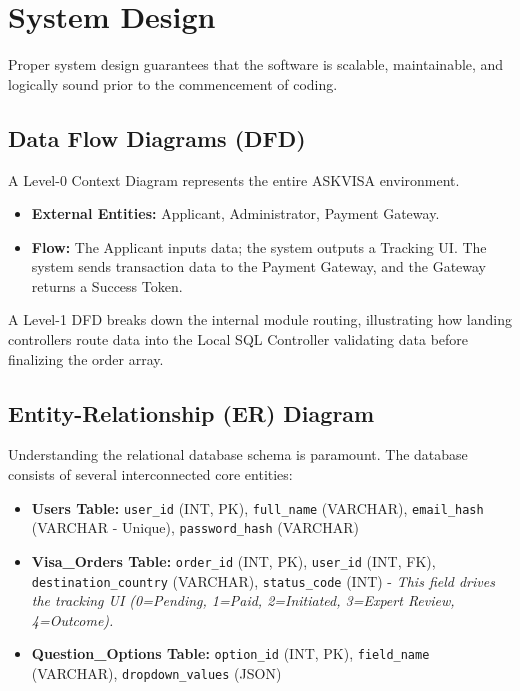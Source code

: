 \documentclass[12pt, a4paper]{article}
\begin{document}
\newpage

\section{System Design}
Proper system design guarantees that the software is scalable, maintainable, and logically sound prior to the commencement of coding.

\subsection{Data Flow Diagrams (DFD)}
A Level-0 Context Diagram represents the entire ASKVISA environment. 
\begin{itemize}
    \item \textbf{External Entities:} Applicant, Administrator, Payment Gateway.
    \item \textbf{Flow:} The Applicant inputs data; the system outputs a Tracking UI. The system sends transaction data to the Payment Gateway, and the Gateway returns a Success Token. 
\end{itemize}
A Level-1 DFD breaks down the internal module routing, illustrating how landing controllers route data into the Local SQL Controller validating data before finalizing the order array.

\subsection{Entity-Relationship (ER) Diagram}
Understanding the relational database schema is paramount. The database consists of several interconnected core entities:
\begin{itemize}
    \item \textbf{Users Table:} \texttt{user\_id} (INT, PK), \texttt{full\_name} (VARCHAR), \texttt{email\_hash} (VARCHAR - Unique), \texttt{password\_hash} (VARCHAR)
    \item \textbf{Visa\_Orders Table:} \texttt{order\_id} (INT, PK), \texttt{user\_id} (INT, FK), \texttt{destination\_country} (VARCHAR), \texttt{status\_code} (INT) - \textit{This field drives the tracking UI (0=Pending, 1=Paid, 2=Initiated, 3=Expert Review, 4=Outcome).}
    \item \textbf{Question\_Options Table:} \texttt{option\_id} (INT, PK), \texttt{field\_name} (VARCHAR), \texttt{dropdown\_values} (JSON)
\end{itemize}
\end{document}
